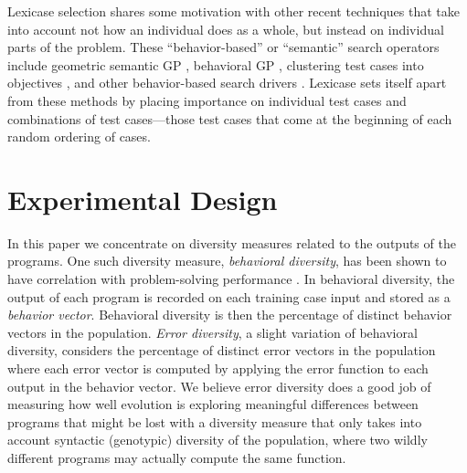 \documentclass{sig-alternate-05-2015}
\begin{document}
Lexicase selection shares some motivation with other recent techniques that take into account not how an individual does as a whole, but instead on individual parts of the problem. These ``behavior-based'' or ``semantic'' search operators include geometric semantic GP \cite{Moraglio2012}, behavioral GP \cite{Krawiec:2014:GECCO}, clustering test cases into objectives \cite{Krawiec:2015:EuroGP, Krawiec:2015:GECCO:smgpWorkshop}, and other behavior-based search drivers \cite{Krawiec:2015:GPTP}. Lexicase sets itself apart from these methods by placing importance on individual test cases and combinations of test cases---those test cases that come at the beginning of each random ordering of cases.


\section{Experimental Design}

In this paper we concentrate on diversity measures related to the outputs of the programs. One such diversity measure, \textit{behavioral diversity}, has been shown to have correlation with problem-solving performance \cite{Jackson:2010:PPSN}. In behavioral diversity, the output of each program is recorded on each training case input and stored as a \textit{behavior vector}. Behavioral diversity is then the percentage of distinct behavior vectors in the population. \textit{Error diversity}, a slight variation of behavioral diversity, considers the percentage of distinct error vectors in the population where each error vector is computed by applying the error function to each output in the behavior vector. We believe error diversity does a good job of measuring how well evolution is exploring meaningful differences between programs that might be lost with a diversity measure that only takes into account syntactic (genotypic) diversity of the population, where two wildly different programs may actually compute the same function.
\end{document}
